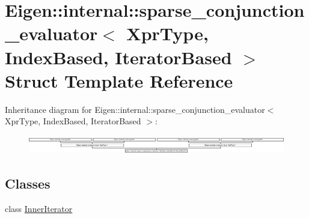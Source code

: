 \hypertarget{struct_eigen_1_1internal_1_1sparse__conjunction__evaluator_3_01_xpr_type_00_01_index_based_00_01_iterator_based_01_4}{}\section{Eigen\+:\+:internal\+:\+:sparse\+\_\+conjunction\+\_\+evaluator$<$ Xpr\+Type, Index\+Based, Iterator\+Based $>$ Struct Template Reference}
\label{struct_eigen_1_1internal_1_1sparse__conjunction__evaluator_3_01_xpr_type_00_01_index_based_00_01_iterator_based_01_4}
Inheritance diagram for Eigen\+:\+:internal\+:\+:sparse\+\_\+conjunction\+\_\+evaluator$<$ Xpr\+Type, Index\+Based, Iterator\+Based $>$\+:\begin{figure}[H]
\begin{center}
\leavevmode
\includegraphics[height=0.828402cm]{struct_eigen_1_1internal_1_1sparse__conjunction__evaluator_3_01_xpr_type_00_01_index_based_00_01_iterator_based_01_4}
\end{center}
\end{figure}
\subsection*{Classes}
\begin{DoxyCompactItemize}
\item 
class \hyperlink{class_eigen_1_1internal_1_1sparse__conjunction__evaluator_3_01_xpr_type_00_01_index_based_00_01_a04df7f6b82f87bde9590608a6f941de}{Inner\+Iterator}
\end{DoxyCompactItemize}
